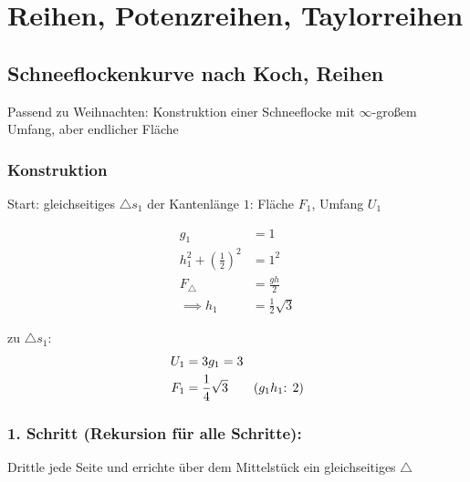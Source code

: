 \section{Reihen, Potenzreihen, Taylorreihen}

\subsection{Schneeflockenkurve nach Koch, Reihen}

Passend zu Weihnachten: Konstruktion einer Schneeflocke mit $\infty$-großem Umfang, aber endlicher Fläche

\subsubsection*{Konstruktion}
Start: gleichseitiges $\triangle s_1$ der Kantenlänge $1$: Fläche $F_1$, Umfang $U_1$

\begin{center}
\end{center}

\begin{align*}
    g_1 &= 1 \\
    h_1^2 + \left(\frac{1}{2}\right)^2 &= 1^2 \\
    F_{\triangle} &= \frac{g h}{2} \\
    \implies h_1 &= \frac{1}{2} \sqrt{3}
\end{align*}

zu $\triangle s_1$:
\begin{align*}
    U_1 &= 3 g_1 = 3 \\
    F_1 &= \frac{1}{4} \sqrt{3} \hspace{20px} \text{($g_1 h_1$: 2)}
\end{align*}

\subsubsection*{1. Schritt (Rekursion für alle Schritte):}

Drittle jede Seite und errichte über dem Mittelstück ein gleichseitiges $\triangle$

